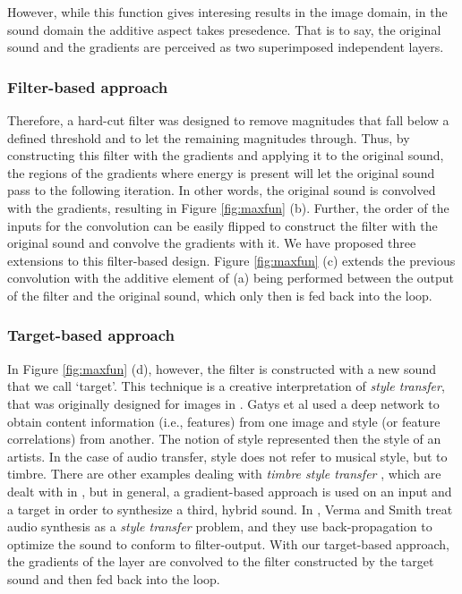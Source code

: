 \documentclass[a4paper,10pt,oneside]{article}
\begin{document}
\begin{sloppy}
However, while this function gives interesing results in the image domain, in the sound domain the additive aspect takes presedence. That is to say, the original sound and the gradients are perceived as two superimposed independent layers.

\subsubsection{Filter-based approach}
Therefore, a hard-cut filter was designed to remove magnitudes that fall below a defined threshold and to let the remaining magnitudes through. Thus, by constructing this filter with the gradients and applying it to the original sound, the regions of the gradients where energy is present will let the original sound pass to the following iteration. In other words, the original sound is convolved with the gradients, resulting in Figure \ref{fig:maxfun} (b). Further, the order of the inputs for the convolution can be easily flipped to construct the filter with the original sound and convolve the gradients with it. We have proposed three extensions to this filter-based design. Figure \ref{fig:maxfun} (c) extends the previous convolution with the additive element of (a) being performed between the output of the filter and the original sound, which only then is fed back into the loop. 


\subsubsection{Target-based approach}
In Figure \ref{fig:maxfun} (d), however, the filter is constructed with a new sound that we call `target'. This technique is a creative interpretation of \textit{style transfer}, that was originally designed for images in \cite{GatysEB15a}. Gatys et al used a deep network to obtain content information (i.e., features) from one image and style (or feature correlations) from another. The notion of style represented then the style of an artists. In the case of audio transfer, style does not refer to musical style, but to timbre. There are other examples dealing with \textit{timbre style transfer} \cite{Foote2016, Ulyanov2016, Wyse2017}, which are dealt with in \cite{Briot2017}, but in general, a gradient-based approach is used on an input and a target in order to synthesize a third, hybrid sound. In \cite{verma2018neural}, Verma and Smith treat audio synthesis as a \textit{style transfer} problem, and they use back-propagation to optimize the sound to conform to filter-output. With our target-based approach, the gradients of the layer are convolved to the filter constructed by the target sound and then fed back into the loop. 


\end{sloppy}
\end{document}
